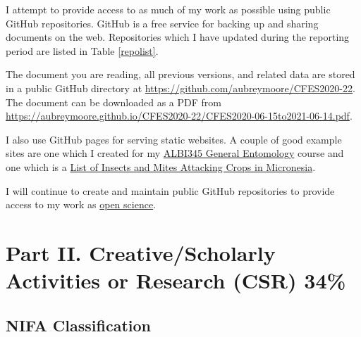 I attempt to provide access to as much of my work as possible using public GitHub repositories. GitHub is a free service for backing up and sharing documents on the web. Repositories which I have updated during the reporting period are listed in Table \ref{repolist}. 

The document you are reading, all previous versions, and related data are stored in a public GitHub directory at \url{https://github.com/aubreymoore/CFES2020-22}. The document can be downloaded as a PDF from
\url{https://aubreymoore.github.io/CFES2020-22/CFES2020-06-15to2021-06-14.pdf}.

I also use GitHub pages for serving static websites. A couple of good example sites are one which I created for my \href{https://aubreymoore.github.io/ALBI-345/}{ALBI345 General Entomology} course and one which is a \href{https://aubreymoore.github.io/crop-pest-list/}{List of Insects and Mites Attacking Crops in Micronesia}.

I will continue to create and maintain public GitHub repositories to provide access to my work as \href{https://en.wikipedia.org/wiki/Open_science}{open science}.
\begin{comment}
\paragraph{Plans for 15JUN2021-14JUN2022}
I will continue to create and maintain GitHub repositories to share my work as part of the \href{https://en.wikipedia.org/wiki/Open_science}{open science} movement.

\paragraph{Plans for 15JUN2022-14JUN2023}
I will continue to create and maintain GitHub repositories to share my work as part of the \href{https://en.wikipedia.org/wiki/Open_science}{open science} movement.
\end{comment}


\section{Part II. Creative/Scholarly Activities or Research (CSR) 34\%}

\subsection{NIFA Classification}


